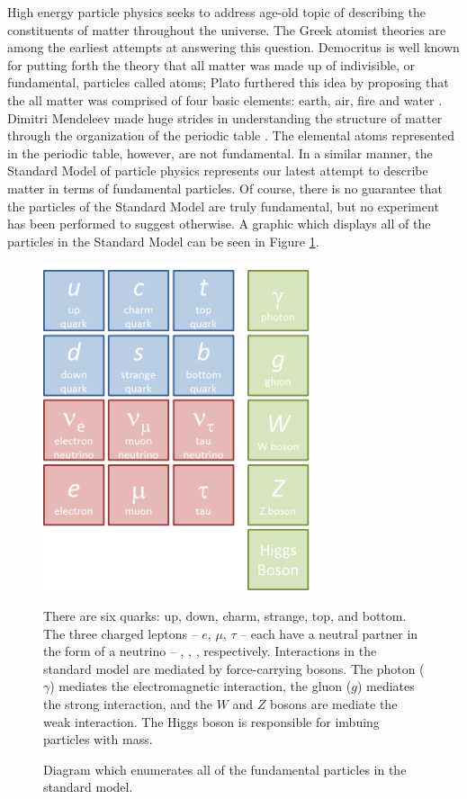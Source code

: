 High energy particle physics seeks to address age-old topic of describing the
constituents of matter throughout the universe.  The Greek atomist theories are
among the earliest attempts at answering this question.
Democritus is well
known for putting forth the theory that all matter was made up of indivisible,
or fundamental, particles called atoms;  Plato furthered this idea by proposing
that the all matter was comprised of four basic elements: earth, air, fire and
water \cite{berryman2008atomism}.  Dimitri Mendeleev made huge strides in
understanding the structure of matter through the organization of the periodic
table \cite{halzen1984quarks}.
The elemental atoms represented in the periodic table, however, are not
fundamental.  In a similar manner, the Standard Model of particle physics
represents our latest attempt to describe matter in terms of fundamental
particles.  Of course, there is no guarantee that the particles of the Standard
Model are truly fundamental, but no experiment has been performed to suggest
otherwise.  A graphic which displays all of the particles in the Standard Model
can be seen in Figure \ref{sm}.



\begin{figure}
  \begin{center}
    \includegraphics[width=0.7\textwidth]{figures/figures/sm.png}
  \end{center}
  \caption{Diagram which enumerates all of the fundamental particles in the
  standard model.}{
  There are six quarks: up, down, charm, strange, top, and
  bottom.
  The three charged leptons -- $e$, $\mu$, $\tau$ -- each have a neutral partner
  in the form of a neutrino -- \nue, \numu, \nutau, respectively.
  Interactions in the standard model are mediated by force-carrying bosons.
  The photon ($\gamma$) mediates the electromagnetic interaction, the gluon
  ($g$) mediates the strong interaction, and the $W$ and $Z$ bosons are
  mediate the weak interaction.
  The Higgs boson is responsible for imbuing particles with mass.
  }
  \label{sm}
\end{figure}

